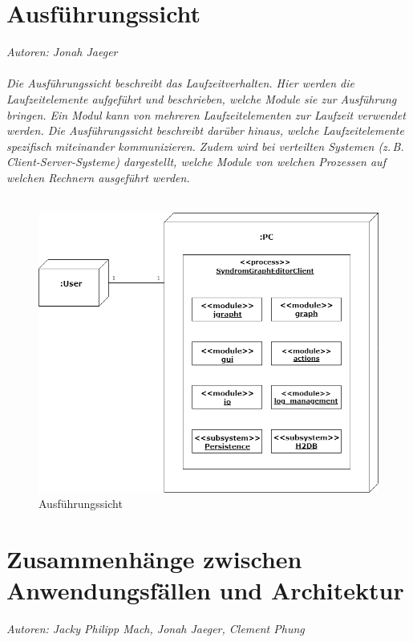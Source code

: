 \documentclass[enabledeprecatedfontcommands,fontsize=11pt,paper=a4,twoside]{scrartcl}
\begin{document}
\section{Ausführungssicht}
\label{sec:ausfuehrung}
\emph{Autoren: Jonah Jaeger}\\ \\
 
{\it
Die Ausführungssicht beschreibt das Laufzeitverhalten. Hier
werden die Laufzeitelemente aufgeführt und beschrieben, welche Module
sie zur Ausführung bringen. Ein Modul kann von mehreren
Laufzeitelementen zur Laufzeit verwendet werden. Die Ausführungssicht
beschreibt darüber hinaus, welche Laufzeitelemente spezifisch
miteinander kommunizieren. Zudem wird bei verteilten Systemen
(z.\,B. Client-Server-Systeme) dargestellt, welche Module von welchen
Prozessen auf welchen Rechnern ausgeführt werden.}\\ \\

\begin{figure}[ht]
	\centering
	\includegraphics[width=1\textwidth]{ausfuehrungssicht.png}
	\caption{Ausführungssicht}
\end{figure}

\newpage{}
\section[Zusammenhänge zwischen Anwendungsfällen und Architektur]{Zusammenhänge zwischen Anwendungsfällen und Architektur}
\label{sec:anwendungsfaelle}
\emph{Autoren: Jacky Philipp Mach, Jonah Jaeger, Clement Phung}\\ \\
\end{document}
